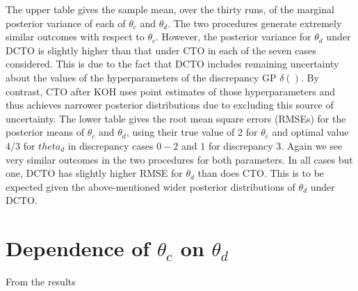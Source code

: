 \documentclass[12pt]{article}
\begin{document}
%
The upper table gives the sample mean, over the thirty runs, of the marginal posterior variance of each of $\theta_c$ and $\theta_d$.
%
The two procedures generate extremely similar outcomes with respect to $\theta_c$.
%
However, the posterior variance for $\theta_d$ under DCTO is slightly higher than that under CTO in each of the seven cases considered.
%
This is due to the fact that DCTO includes remaining uncertainty about the values of the hyperparameters of the discrepancy GP $\delta()$.
%
By contrast, CTO after KOH uses point estimates of those hyperparameters and thus achieves narrower posterior distributions due to excluding this source of uncertainty.
%
The lower table gives the root mean square errors (RMSEs) for the posterior means of $\theta_c$ and $\theta_d$, using their true value of 2 for $\theta_c$ and optimal value $4/3$ for $theta_d$ in discrepancy cases $0-2$ and $1$ for discrepancy 3.
%
Again we see very similar outcomes in the two procedures for both parameters.
%
In all cases but one, DCTO has slightly higher RMSE for $\theta_d$ than does CTO.
%
This is to be expected given the above-mentioned wider posterior distributions of $\theta_d$ under DCTO.
%

%
\section{Dependence of $\theta_c$ on $\theta_d$}
%
From the results 
%
\end{document}
